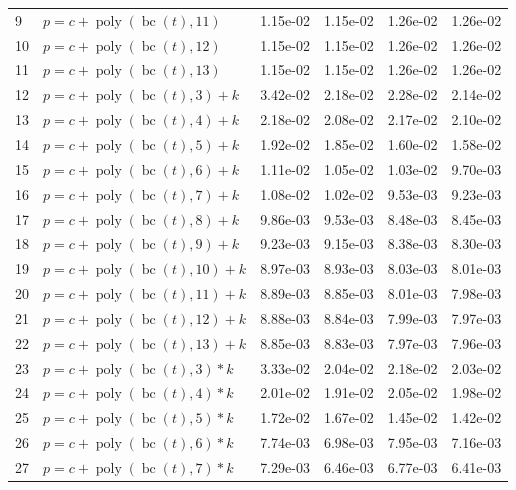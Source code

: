 \documentclass[12pt,a4paper]{article}
\DeclareMathOperator{\bc}{bc}
\DeclareMathOperator{\poly}{poly}
\begin{document}
\begin{longtable}[t]{ll>{\raggedleft\arraybackslash}p{2cm}>{\raggedleft\arraybackslash}p{2cm}>{\raggedleft\arraybackslash}p{2cm}>{\raggedleft\arraybackslash}p{2cm}}
\rowcolor{gray!6}  9 & $p = c + \poly\left( \bc(t), 11 \right)$ & 1.15e-02 & 1.15e-02 & 1.26e-02 & 1.26e-02\\
10 & $p = c + \poly\left( \bc(t), 12 \right)$ & 1.15e-02 & 1.15e-02 & 1.26e-02 & 1.26e-02\\
\rowcolor{gray!6}  11 & $p = c + \poly\left( \bc(t), 13 \right)$ & 1.15e-02 & 1.15e-02 & 1.26e-02 & 1.26e-02\\
12 & $p = c + \poly\left( \bc(t), 3 \right) + k$ & 3.42e-02 & 2.18e-02 & 2.28e-02 & 2.14e-02\\
\rowcolor{gray!6}  13 & $p = c + \poly\left( \bc(t), 4 \right) + k$ & 2.18e-02 & 2.08e-02 & 2.17e-02 & 2.10e-02\\
14 & $p = c + \poly\left( \bc(t), 5 \right) + k$ & 1.92e-02 & 1.85e-02 & 1.60e-02 & 1.58e-02\\
\rowcolor{gray!6}  15 & $p = c + \poly\left( \bc(t), 6 \right) + k$ & 1.11e-02 & 1.05e-02 & 1.03e-02 & 9.70e-03\\
16 & $p = c + \poly\left( \bc(t), 7 \right) + k$ & 1.08e-02 & 1.02e-02 & 9.53e-03 & 9.23e-03\\
\rowcolor{gray!6}  17 & $p = c + \poly\left( \bc(t), 8 \right) + k$ & 9.86e-03 & 9.53e-03 & 8.48e-03 & 8.45e-03\\
18 & $p = c + \poly\left( \bc(t), 9 \right) + k$ & 9.23e-03 & 9.15e-03 & 8.38e-03 & 8.30e-03\\
\rowcolor{gray!6}  19 & $p = c + \poly\left( \bc(t), 10 \right) + k$ & 8.97e-03 & 8.93e-03 & 8.03e-03 & 8.01e-03\\
20 & $p = c + \poly\left( \bc(t), 11 \right) + k$ & 8.89e-03 & 8.85e-03 & 8.01e-03 & 7.98e-03\\
\rowcolor{gray!6}  21 & $p = c + \poly\left( \bc(t), 12 \right) + k$ & 8.88e-03 & 8.84e-03 & 7.99e-03 & 7.97e-03\\
22 & $p = c + \poly\left( \bc(t), 13 \right) + k$ & 8.85e-03 & 8.83e-03 & 7.97e-03 & 7.96e-03\\
\rowcolor{gray!6}  23 & $p = c + \poly\left( \bc(t), 3 \right) * k$ & 3.33e-02 & 2.04e-02 & 2.18e-02 & 2.03e-02\\
24 & $p = c + \poly\left( \bc(t), 4 \right) * k$ & 2.01e-02 & 1.91e-02 & 2.05e-02 & 1.98e-02\\
\rowcolor{gray!6}  25 & $p = c + \poly\left( \bc(t), 5 \right) * k$ & 1.72e-02 & 1.67e-02 & 1.45e-02 & 1.42e-02\\
26 & $p = c + \poly\left( \bc(t), 6 \right) * k$ & 7.74e-03 & 6.98e-03 & 7.95e-03 & 7.16e-03\\
\rowcolor{gray!6}  27 & $p = c + \poly\left( \bc(t), 7 \right) * k$ & 7.29e-03 & 6.46e-03 & 6.77e-03 & 6.41e-03\\

\end{longtable}
\end{document}
